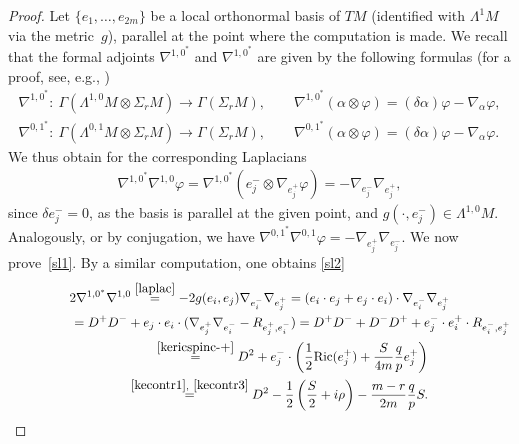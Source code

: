 \documentclass[10pt,a4paper]{amsart}
\numberwithin{equation}{section}
\theoremstyle{definition}
\begin{document}
\begin{proof}
Let $\{e_1,\dots, e_{2m}\}$ be a local orthonormal basis of $TM$ (identif\/ied with $\Lambda^1 M$ via the met\-ric~$g$), parallel at the point where the computation is made. We recall that the formal adjoints $\nabla^{{1,0}^*}$ and $\nabla^{{1,0}^*}$ are given by the following formulas (for a proof, see, e.g., \cite[Lemma~20.1]{am_lectures})
\begin{gather*}
\nabla^{{1,0}^*}\colon \ \Gamma(\Lambda^{1,0}M\otimes\Sigma_{r}M) \longrightarrow \Gamma(\Sigma_{r}M), \qquad \nabla^{{1,0}^*}(\alpha\otimes \varphi)=(\delta\alpha)\varphi-\nabla_
{\alpha}\varphi,\\
 \nabla^{{0,1}^*}\colon \ \Gamma(\Lambda^{0,1}M\otimes\Sigma_{r}M) \longrightarrow \Gamma(\Sigma_{r}M), \qquad \nabla^{{0,1}^*}(\alpha\otimes \varphi)=(\delta\alpha)\varphi-\nabla_
{\alpha}\varphi.
\end{gather*}
We thus obtain for the corresponding Laplacians
\begin{gather}\label{laplac}
\nabla^{{1,0}^*}\nabla^{1,0}\varphi
=\nabla^{{1,0}^*}(e^-_j\otimes \nabla_{e^+_j}\varphi)=- \nabla_{e^-_j}\nabla_{e^+_j},
\end{gather}
since $\delta e^-_j=0$, as the basis is  parallel at the given point, and $g(\cdot, e^-_j)\in\Lambda^{1,0}M$. Analogously, or by conjugation, we have $\nabla^{{0,1}^*}\nabla^{0,1}\varphi
=- \nabla_{e^+_j}\nabla_{e^-_j}$.
We now prove~\eqref{sl1}. By a similar computation, one obtains \eqref{sl2}
\begin{gather*}
 2\nabla^{{1,0}^*}\nabla^{1,0} \overset{\eqref{laplac}}{=}-2g(e_i,e_j)\nabla_{e_i^-}\nabla_{e_j^+}=(e_i\cdot e_j + e_j\cdot e_i) \cdot \nabla_{e_i^-}\nabla_{e_j^+}\\
\hphantom{2\nabla^{{1,0}^*}\nabla^{1,0}}{}
  =D^+D^- + e_j\cdot e_i\cdot (\nabla_{e_j^+}\nabla_{e_i^-} - R_{e_j^+,e_i^-})=D^+D^- + D^-D^+ + e_j^-\cdot e^+_i\cdot R_{e_i^-, e_j^+}\\
 \hphantom{2\nabla^{{1,0}^*}\nabla^{1,0}}{}
 \overset{\eqref{kericspinc-+}}{=}D^2+e^-_j\cdot \left( \frac{1}{2}\mathrm{Ric}(e_j^+)+\frac{S}{4m}\frac{q}{p}e_j^+\right)\\
  \hphantom{2\nabla^{{1,0}^*}\nabla^{1,0}}{}
  \overset{\eqref{kecontr1},~\eqref{kecontr3}}{=}D^2 -\frac{1}{2}\left(\frac{S}{2}+i\rho\right)-\frac{m-r}{2m}\frac{q}{p}S.\tag*{\qed}
 \end{gather*}
 \renewcommand{\qed}{}
\end{proof}
\end{document}
